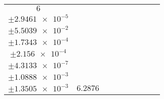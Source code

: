 \documentclass[8pt]{article}
\begin{document}
\begin{longtable}[l]{c c c c c c c c c}
$\num{6}$ & \begin{tabular}[c]{@{}c@{}}$\num{3.0729e-2}$ \\ $\pm\num{2.9461e-5}$\end{tabular} & \begin{tabular}[c]{@{}c@{}}$\num{0.7457}$ \\ $\pm\num{5.5039e-2}$\end{tabular} & \begin{tabular}[c]{@{}c@{}}$\num{8.501}$ \\ $\pm\num{1.7343e-4}$\end{tabular} & \begin{tabular}[c]{@{}c@{}}$\num{646.18}$ \\ $\pm\num{2.156e-4}$\end{tabular} & \begin{tabular}[c]{@{}c@{}}$\num{1.2927}$ \\ $\pm\num{4.3133e-7}$\end{tabular} & \begin{tabular}[c]{@{}c@{}}$\num{0.95703}$ \\ $\pm\num{1.0888e-3}$\end{tabular} & \begin{tabular}[c]{@{}c@{}}$\num{0.95275}$ \\ $\pm\num{1.3505e-3}$\end{tabular} & $\num{6.2876}$\\
\bottomrule
\end{longtable}
\end{document}

